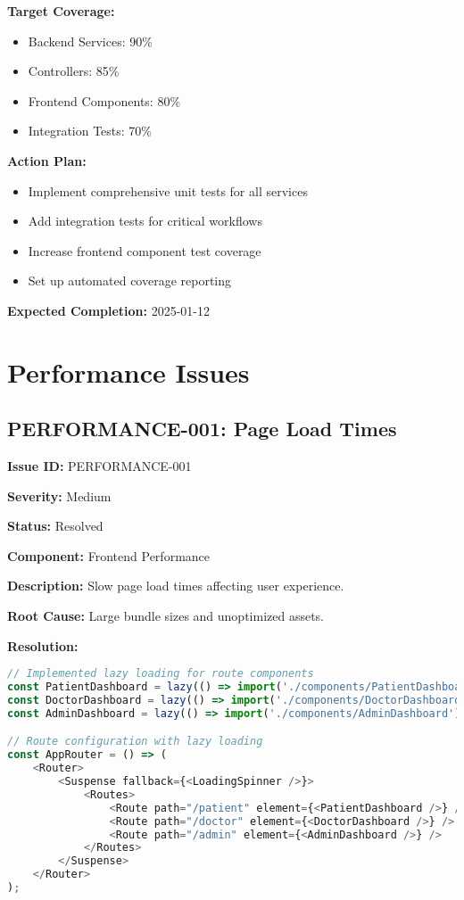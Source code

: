\documentclass[12pt,a4paper]{article}
\begin{document}
\textbf{Target Coverage:}
\begin{itemize}
    \item Backend Services: 90\%
    \item Controllers: 85\%
    \item Frontend Components: 80\%
    \item Integration Tests: 70\%
\end{itemize}

\textbf{Action Plan:}
\begin{itemize}
    \item Implement comprehensive unit tests for all services
    \item Add integration tests for critical workflows
    \item Increase frontend component test coverage
    \item Set up automated coverage reporting
\end{itemize}

\textbf{Expected Completion:} 2025-01-12

\section{Performance Issues}

\subsection{PERFORMANCE-001: Page Load Times}

\textbf{Issue ID:} PERFORMANCE-001

\textbf{Severity:} Medium

\textbf{Status:} Resolved

\textbf{Component:} Frontend Performance

\textbf{Description:} Slow page load times affecting user experience.

\textbf{Root Cause:} Large bundle sizes and unoptimized assets.

\textbf{Resolution:}
\begin{lstlisting}[language=JavaScript, caption=Code Splitting Implementation]
// Implemented lazy loading for route components
const PatientDashboard = lazy(() => import('./components/PatientDashboard'));
const DoctorDashboard = lazy(() => import('./components/DoctorDashboard'));
const AdminDashboard = lazy(() => import('./components/AdminDashboard'));

// Route configuration with lazy loading
const AppRouter = () => (
    <Router>
        <Suspense fallback={<LoadingSpinner />}>
            <Routes>
                <Route path="/patient" element={<PatientDashboard />} />
                <Route path="/doctor" element={<DoctorDashboard />} />
                <Route path="/admin" element={<AdminDashboard />} />
            </Routes>
        </Suspense>
    </Router>
);
\end{lstlisting}
\end{document}
